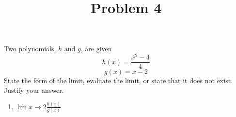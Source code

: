 \documentclass{ximera}
\title[Problem 4]{Problem 4}
\begin{document}
\begin{abstract} \end{abstract}
\maketitle


\begin{problem}
	Two polynomials, $h$ and $g$, are given
	\[ h(x)=\frac{x^2-4}{4} \]
	\[ g(x)=x-2 \]
	 State the form of the limit, evaluate the limit, or state that it does not exist.  Justify your answer.
		
		\begin{enumerate}
		
		\item $\displaystyle \lim{x \to 2}\frac{h(x)}{g(x)}$


\end{enumerate}
\end{problem}
\end{document}
